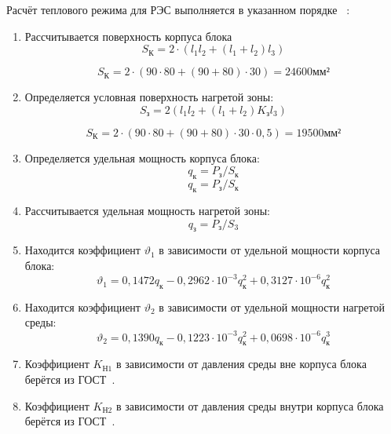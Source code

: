 Расчёт теплового режима для РЭС выполняется в указанном порядке
~\cite{Rotkop1976}:
\begin{enumerate}
\item Рассчитывается поверхность корпуса блока
  \begin{equation}
    S_{К} = 2 \cdot (l_1 l_2 + (l_1+ l_2)l_3) %
  \end{equation}

  $$S_{К} = 2 \cdot (90 \cdot 80 + (90 + 80) \cdot 30) = 24600 мм²$$
  
\item Определяется условная поверхность нагретой зоны:
  \begin{equation}
    S_{з} = 2 (l_1 l_2 + (l_1 + l_2) K_{з} l_3 ) %
  \end{equation}

  $$S_{К} = 2 \cdot (90 \cdot 80 + (90 + 80) \cdot 30 \cdot 0,5) = 19500 мм²$$
\item Определяется удельная мощность корпуса блока:
%
\begin{equation}
  q_к = P_з/S_к %
\end{equation}
%
$$ q_к = P_з/S_к $$
\item Рассчитывается удельная мощность нагретой зоны:
  \begin{equation}
      q_з = P_з/S_3 %
    \end{equation}

\item Находится коэффициент $\vartheta_1$ в зависимости от удельной мощности корпуса блока:
\begin{equation}
\vartheta_1 = 0,1472q_к - 0,2962 \cdot 10^{-3}q_к^2 + 0,3127 \cdot 10^{-6}q_к^2
\end{equation}

\item Находится коэффициент $\vartheta_2$ в зависимости от удельной мощности нагретой среды:
%
\begin{equation}
\vartheta_2 = 0,1390q_к - 0,1223 \cdot 10^{-3}q_к^2 + 0,0698 \cdot 10^{-6}q_к^3
\end{equation}

\item Коэффициент $K_{Н1}$ в зависимости от давления
  среды вне корпуса блока берётся из ГОСТ~\cite{GOST-15150-69}.

\item Коэффициент $K_{Н2}$ в зависимости от давления
  среды внутри корпуса блока берётся из ГОСТ~\cite{GOST-15150-69}.


\end{enumerate}
